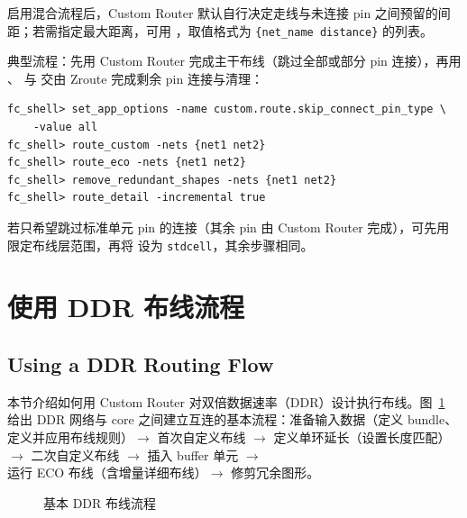 启用混合流程后，Custom Router 默认自行决定走线与未连接 pin 之间预留的间距；若需指定最大距离，可用 ，取值格式为 \texttt{\{net\_name distance\}} 的列表。

典型流程：先用 Custom Router 完成主干布线（跳过全部或部分 pin 连接），再用 、 与  交由 Zroute 完成剩余 pin 连接与清理：

\begin{lstlisting}
fc_shell> set_app_options -name custom.route.skip_connect_pin_type \
    -value all
fc_shell> route_custom -nets {net1 net2}
fc_shell> route_eco -nets {net1 net2}
fc_shell> remove_redundant_shapes -nets {net1 net2}
fc_shell> route_detail -incremental true
\end{lstlisting}

若只希望跳过标准单元 pin 的连接（其余 pin 由 Custom Router 完成），可先用  限定布线层范围，再将  设为 \texttt{stdcell}，其余步骤相同。

\section{使用 DDR 布线流程}
\subsection*{Using a DDR Routing Flow}

本节介绍如何用 Custom Router 对双倍数据速率（DDR）设计执行布线。图~\ref{fig:ddr-basic-flow} 给出 DDR 网络与 core 之间建立互连的基本流程：准备输入数据（定义 bundle、定义并应用布线规则）$\to$ 首次自定义布线 $\to$ 定义单环延长（设置长度匹配）$\to$ 二次自定义布线 $\to$ 插入 buffer 单元 $\to$ 运行 ECO 布线（含增量详细布线）$\to$ 修剪冗余图形。

\begin{figure}[htbp]
\centering
{}
\caption{基本 DDR 布线流程}
\label{fig:ddr-basic-flow}
\end{figure}

